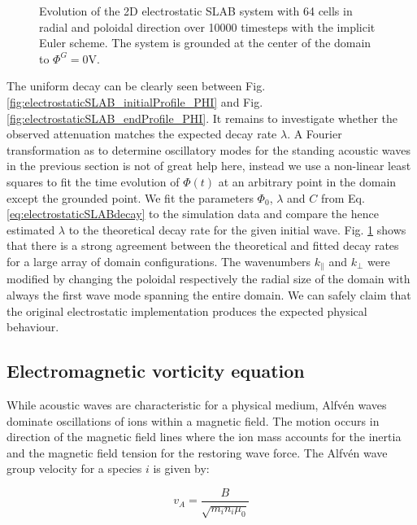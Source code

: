 \begin{figure}[H]
\begin{subfigure}[b]{0.30\textwidth}
		\label{fig:electrostaticSLAB_decayRateFit}
	\end{subfigure}
	\caption[Evolution of the 2D electrostatic SLAB system with 64 cells in radial and poloidal direction over 10000 timesteps with the implicit Euler scheme]{Evolution of the 2D electrostatic SLAB system with 64 cells in radial and poloidal direction over 10000 timesteps with the implicit Euler scheme. The system is grounded at the center of the domain to $\Phi^G = 0$V.}
	\label{fig:electrostaticSLAB}
\end{figure}

The uniform decay can be clearly seen between Fig. \ref{fig:electrostaticSLAB_initialProfile_PHI} and Fig. \ref{fig:electrostaticSLAB_endProfile_PHI}. It remains to investigate whether the observed attenuation matches the expected decay rate $\lambda$. A Fourier transformation as to determine oscillatory modes for the standing acoustic waves in the previous section is not of great help here, instead we use a non-linear least squares to fit the time evolution of $\Phi(t)$ at an arbitrary point in the domain except the grounded point. We fit the parameters $\Phi_0$, $\lambda$ and $C$ from Eq. \ref{eq:electrostaticSLABdecay} to the simulation data and compare the hence estimated $\lambda$ to the theoretical decay rate for the given initial wave. Fig. \ref{fig:electrostaticSLAB_decayRateFit} shows that there is a strong agreement between the theoretical and fitted decay rates for a large array of domain configurations. The wavenumbers $k_\parallel$ and $k_\perp$ were modified by changing the poloidal respectively the radial size of the domain with always the first wave mode spanning the entire domain. We can safely claim that the original electrostatic implementation produces the expected physical behaviour.

\subsection{Electromagnetic vorticity equation}
While acoustic waves are characteristic for a physical medium, Alfvén waves dominate oscillations of ions within a magnetic field. The motion occurs in direction of the magnetic field lines where the ion mass accounts for the inertia and the magnetic field tension for the restoring wave force. The Alfvén wave group velocity for a species $i$ is given by:

\begin{equation}
	v_A = \frac{B}{\sqrt{m_in_i\mu_0}} \label{eq:AlfvenGroupVelocity}
\end{equation}

